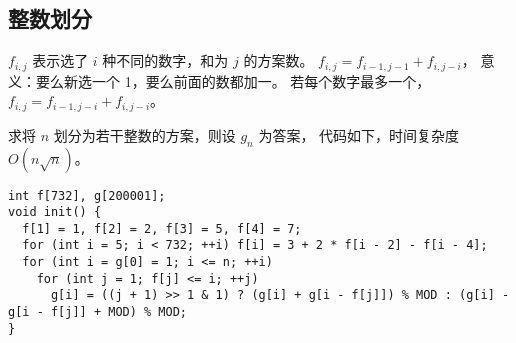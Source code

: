 \subsection{整数划分}

$f_{i, j}$ 表示选了 $i$ 种不同的数字，和为 $j$ 的方案数。
$f_{i, j} = f_{i - 1, j - 1} + f_{i, j - i}$，
意义：要么新选一个 1，要么前面的数都加一。
若每个数字最多一个，$f_{i, j} = f_{i - 1, j - i} + f_{i, j - i}$。

求将 $n$ 划分为若干整数的方案，则设 $g_{n}$ 为答案，
代码如下，时间复杂度 $O(n\sqrt{n})$。
\begin{lstlisting}
int f[732], g[200001];
void init() {
  f[1] = 1, f[2] = 2, f[3] = 5, f[4] = 7;
  for (int i = 5; i < 732; ++i) f[i] = 3 + 2 * f[i - 2] - f[i - 4];
  for (int i = g[0] = 1; i <= n; ++i)
    for (int j = 1; f[j] <= i; ++j)
      g[i] = ((j + 1) >> 1 & 1) ? (g[i] + g[i - f[j]]) % MOD : (g[i] - g[i - f[j]] + MOD) % MOD;
}
\end{lstlisting}